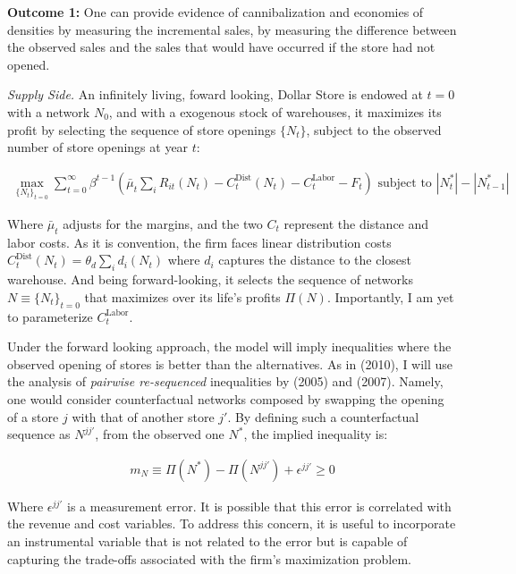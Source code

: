 \documentclass[11pt]{article}
\newcounter{fox}
\begin{document}
\textbf{Outcome 1:} One can provide evidence of cannibalization and economies of densities by measuring the incremental sales, by measuring the difference between the observed sales and the sales that would have occurred if the store had not opened. 

\textit{Supply Side.}  An infinitely living, foward looking, {Dollar Store} is endowed at $t=0$ with a network $N_0$, and with a exogenous stock of warehouses, it maximizes its profit by selecting the sequence of store openings $\{N_t\}$, subject to the observed number of store openings at year $t$:

\vspace{-8mm}


\begin{align}
    \max_{\{N_t\}_{t=0}}\sum_{t=0}^\infty \beta^{t-1} \left(\bar \mu_t\sum_{i}   R_{it}(N_t) - C_t^\text{Dist}(N_t) - C_t^\text{Labor} - F_t\right) \text{ subject to }  |N_t^*|-|N_{t-1}^*| 
\end{align}

 Where $\bar \mu_t$ adjusts for the margins, and the two $C_t$ represent the distance and labor costs. As it is convention, the firm faces linear distribution costs $C_t^{\text{Dist}}(N_t) = \theta_d \sum_{i}  d_{i}(N_t)$ where $d_{i}$ captures the distance to the closest warehouse. And being forward-looking, it selects the sequence of networks $N\equiv \{N_t\}_{t=0}$ that maximizes over its life's profits $\Pi(N)$. Importantly, I am yet to parameterize $C_t^{\text{Labor}}$.
 
Under the forward looking approach, the model will imply inequalities where the observed opening of stores is better than the alternatives.  As in \citeauthor{holmes2011diffusion} (2010), I will use the analysis of \textit{pairwise re-sequenced} inequalities by \citeauthor{bajari2005measuring} (2005) and \citeauthor{fox2007semiparametric} (2007). Namely, one would consider counterfactual networks composed by swapping the opening of a store $j$ with that of another store $j'$. By defining such a counterfactual sequence as $N^{jj'}$, from the observed one $N^*$, the implied inequality is:

\vspace{-15mm}


\begin{align}
    m_N \equiv \Pi(N^*) - \Pi(N^{jj'}) + \epsilon^{jj'} \geq 0
\end{align}
\vspace{-10mm}


   Where $\epsilon^{jj'}$ is a measurement error. It is possible that this error is correlated with the revenue and cost variables. To address this concern, it is useful to incorporate an instrumental variable that is not related to the error but is capable of capturing the trade-offs associated with the firm's maximization problem. 
   
\end{document}

